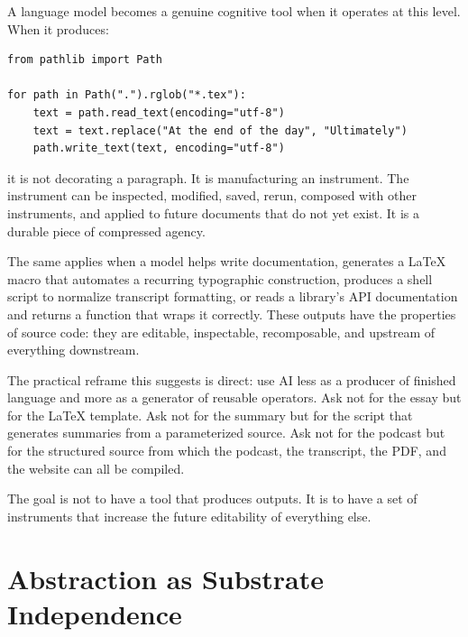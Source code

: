 \documentclass[12pt]{article}
\begin{document}
A language model becomes a genuine cognitive tool when it operates at this level. When it produces:

\begin{mdframed}[backgroundcolor=quoteblock,linewidth=0pt,innerleftmargin=12pt,innerrightmargin=12pt,innertopmargin=8pt,innerbottommargin=8pt]
\small
\begin{verbatim}
from pathlib import Path

for path in Path(".").rglob("*.tex"):
    text = path.read_text(encoding="utf-8")
    text = text.replace("At the end of the day", "Ultimately")
    path.write_text(text, encoding="utf-8")
\end{verbatim}
\end{mdframed}

it is not decorating a paragraph. It is manufacturing an instrument. The instrument can be inspected, modified, saved, rerun, composed with other instruments, and applied to future documents that do not yet exist. It is a durable piece of compressed agency.

The same applies when a model helps write documentation, generates a \LaTeX{} macro that automates a recurring typographic construction, produces a shell script to normalize transcript formatting, or reads a library's API documentation and returns a function that wraps it correctly. These outputs have the properties of source code: they are editable, inspectable, recomposable, and upstream of everything downstream.

The practical reframe this suggests is direct: use AI less as a producer of finished language and more as a generator of reusable operators. Ask not for the essay but for the \LaTeX{} template. Ask not for the summary but for the script that generates summaries from a parameterized source. Ask not for the podcast but for the structured source from which the podcast, the transcript, the PDF, and the website can all be compiled.

The goal is not to have a tool that produces outputs. It is to have a set of instruments that increase the future editability of everything else.

\section{Abstraction as Substrate Independence}
\end{document}
